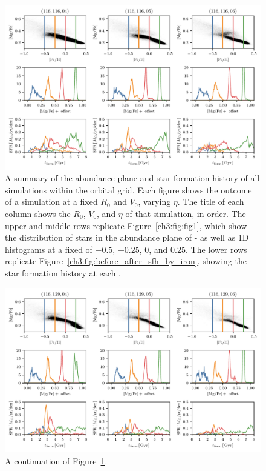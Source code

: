 \begin{appendices}
\begin{figure}
  \centering
  \includegraphics[width=\textwidth]{ch3/allmerge0.pdf}
  \caption{A summary of the abundance plane and star formation history of all simulations within the orbital grid. Each figure shows the outcome of a simulation at a fixed $R_0$ and $V_0$, varying $\eta$. The title of each column shows the $R_0$, $V_0$, and $\eta$ of that simulation, in order. The upper and middle rows replicate Figure~\ref{ch3:fig:fig1}, which show the distribution of stars in the abundance plane of \MgFe{}-\FeH{} as well as 1D histograms at a fixed \FeH{} of $-0.5$, $-0.25$, $0$, and $0.25$. The lower rows replicate Figure~\ref{ch3:fig:before_after_sfh_by_iron}, showing the star formation history at each \FeH{}.}
  \label{fig:allmerge0}
\end{figure}

\begin{figure}
  \centering
  \includegraphics[width=\textwidth]{ch3/allmerge1.pdf}
  \caption{A continuation of Figure~\ref{fig:allmerge0}.}
  \label{fig:allmerge1}
\end{figure}


\end{appendices}
